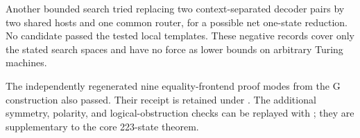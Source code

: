 Another bounded search tried replacing two context-separated decoder
pairs by two shared hosts and one common router, for a possible net
one-state reduction.  No candidate passed the tested local templates.
These negative records cover only the stated search spaces and have no
force as lower bounds on arbitrary Turing machines.

The independently regenerated nine equality-frontend proof modes from
the G construction also passed.  Their receipt is retained under
.  The additional
symmetry, polarity, and logical-obstruction checks can be replayed with
; they are supplementary
to the core 223-state theorem.
